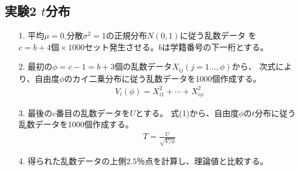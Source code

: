 \documentclass[12pt]{jarticle}
\begin{document}
\subsection{実験2 $t$分布}
\begin{itemize}
    \item [1.]平均$\mu=0$,分散$\sigma^2=1$の正規分布$N(0,1)$に従う乱数データ
          を$c=b+4個\times 1000セット$発生させる。$b$は学籍番号の下一桁とする。
    \item [2.]最初の$\phi=c-1=b+3$個の乱数データ$X_{ij}(j=1...,\phi)$から、
          次式により、自由度$\phi$のカイ二乗分布に従う乱数データを1000個作成する。
          \begin{eqnarray}
              V_i(\phi)=X_{i1}^2+\cdots+X_{i\phi}^2\nonumber
          \end{eqnarray}
    \item [3.]最後の$c$番目の乱数データを$U$とする。
          式(1)から、自由度$\phi$の$t$分布に従う乱数データを1000個作成する。
          \begin{eqnarray}
              T=\frac{U}{\sqrt{V/\phi}}
          \end{eqnarray}
    \item [4.]得られた乱数データの上側$2.5％$点を計算し、理論値と比較する。
\end{itemize}
\end{document}
